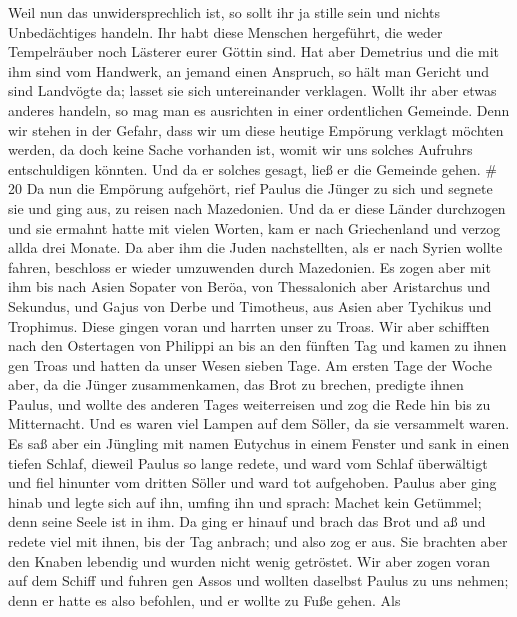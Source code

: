  Weil nun das unwidersprechlich ist, so sollt ihr ja stille
sein und nichts Unbedächtiges handeln.  Ihr habt diese
Menschen hergeführt, die weder Tempelräuber noch Lästerer eurer Göttin
sind.  Hat aber Demetrius und die mit ihm sind vom
Handwerk, an jemand einen Anspruch, so hält man Gericht und sind
Landvögte da; lasset sie sich untereinander verklagen. 
Wollt ihr aber etwas anderes handeln, so mag man es ausrichten in einer
ordentlichen Gemeinde.  Denn wir stehen in der Gefahr, dass
wir um diese heutige Empörung verklagt möchten werden, da doch keine
Sache vorhanden ist, womit wir uns solches Aufruhrs entschuldigen
könnten. Und da er solches gesagt, ließ er die Gemeinde gehen. \# 20
 Da nun die Empörung aufgehört, rief Paulus die Jünger zu
sich und segnete sie und ging aus, zu reisen nach Mazedonien.
 Und da er diese Länder durchzogen und sie ermahnt hatte mit
vielen Worten, kam er nach Griechenland und verzog allda drei Monate.
 Da aber ihm die Juden nachstellten, als er nach Syrien
wollte fahren, beschloss er wieder umzuwenden durch Mazedonien.
 Es zogen aber mit ihm bis nach Asien Sopater von Beröa, von
Thessalonich aber Aristarchus und Sekundus, und Gajus von Derbe und
Timotheus, aus Asien aber Tychikus und Trophimus.  Diese
gingen voran und harrten unser zu Troas.  Wir aber schifften
nach den Ostertagen von Philippi an bis an den fünften Tag und kamen zu
ihnen gen Troas und hatten da unser Wesen sieben Tage.  Am
ersten Tage der Woche aber, da die Jünger zusammenkamen, das Brot zu
brechen, predigte ihnen Paulus, und wollte des anderen Tages
weiterreisen und zog die Rede hin bis zu Mitternacht.  Und
es waren viel Lampen auf dem Söller, da sie versammelt waren.
 Es saß aber ein Jüngling mit namen Eutychus in einem
Fenster und sank in einen tiefen Schlaf, dieweil Paulus so lange redete,
und ward vom Schlaf überwältigt und fiel hinunter vom dritten Söller und
ward tot aufgehoben.  Paulus aber ging hinab und legte sich
auf ihn, umfing ihn und sprach: Machet kein Getümmel; denn seine Seele
ist in ihm.  Da ging er hinauf und brach das Brot und aß
und redete viel mit ihnen, bis der Tag anbrach; und also zog er aus.
 Sie brachten aber den Knaben lebendig und wurden nicht
wenig getröstet.  Wir aber zogen voran auf dem Schiff und
fuhren gen Assos und wollten daselbst Paulus zu uns nehmen; denn er
hatte es also befohlen, und er wollte zu Fuße gehen.  Als
